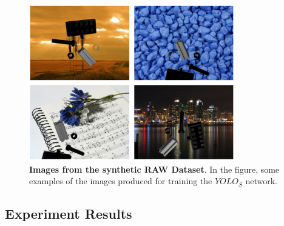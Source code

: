 \begin{figure}
    \centering
    \includegraphics[width=0.8\textwidth]{figures/4_experiments/synthetic_dataset_ex}
    \caption{\textbf{Images from the synthetic RAW Dataset}. In the figure, some examples of the images produced for training the $YOLO_S$ network.}
    \label{fig:synthetic_dataset_ex}
\end{figure}
\subsection{Experiment Results}

